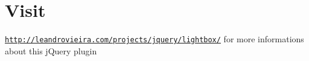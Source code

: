 \hypertarget{_visit-example}{\section{Visit}
}
\href{http://leandrovieira.com/projects/jquery/lightbox/}{\tt http\-://leandrovieira.\-com/projects/jquery/lightbox/} for more informations about this j\-Query plugin


\begin{DoxyCodeInclude}
\end{DoxyCodeInclude}
 